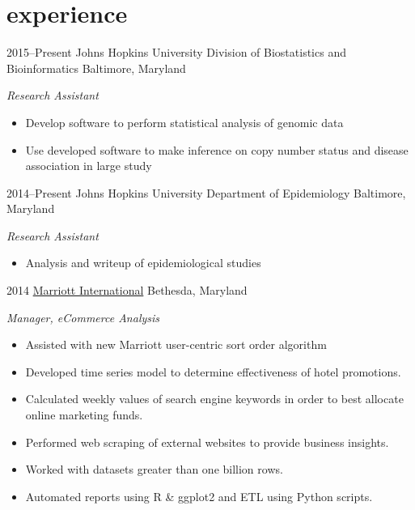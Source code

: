 \documentclass[]{friggeri-cv} %
\begin{document}

\section{experience}

\begin{entrylist}
\entry
{2015--Present}
{Johns Hopkins University Division of Biostatistics and Bioinformatics}
{Baltimore, Maryland}
{\emph{Research Assistant}
\begin{itemize}
\renewcommand\labelitemi{--}
\item Develop software to perform statistical analysis of genomic data
\item Use developed software to make inference on copy number status and disease association in large study
\end{itemize}
}
\entry
{2014--Present}
{Johns Hopkins University Department of Epidemiology}
{Baltimore, Maryland}
{\emph{Research Assistant}
\begin{itemize}
\renewcommand\labelitemi{--}
\item Analysis and writeup of epidemiological studies
\end{itemize}
}
\entry
{2014}
{\href{http://www.marriott.com/}{Marriott International}}
{Bethesda, Maryland}
{\emph{Manager, eCommerce Analysis}
\begin{itemize}
\renewcommand\labelitemi{--}
\item Assisted with new Marriott user-centric sort order algorithm
\item Developed time series model to determine effectiveness of hotel promotions. 
\item Calculated weekly values of search engine keywords in order to best allocate online marketing funds.
\item Performed web scraping of external websites to provide business insights.
\item Worked with datasets greater than one billion rows.
\item Automated reports using R \& ggplot2 and ETL using Python scripts.
\end{itemize}
}

\end{entrylist}
\end{document}
